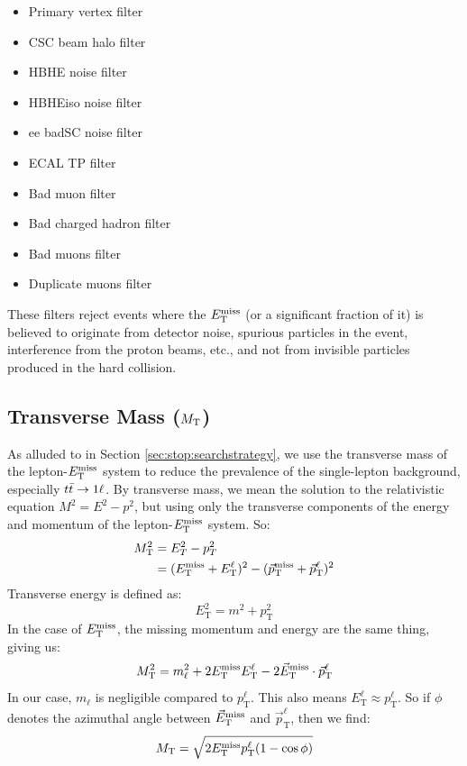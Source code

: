 \begin{itemize}
\item Primary vertex filter
\item CSC beam halo filter
\item HBHE noise filter
\item HBHEiso noise filter
\item ee badSC noise filter
\item ECAL TP filter
\item Bad muon filter
\item Bad charged hadron filter
\item Bad muons filter
\item Duplicate muons filter
\end{itemize}

These filters reject events where the $E_\text{T}^\text{miss}$ (or a significant
fraction of it) is believed to originate from detector noise, spurious
particles in the event, interference from the proton beams, etc., and
not from invisible particles produced in the hard collision.

\subsection{Transverse Mass (\texorpdfstring{$M_\text{T}$}{MT})}
\label{ssec:stop:mt}

As alluded to in Section \ref{sec:stop:searchstrategy}, we use the
transverse mass of the lepton-$E_\text{T}^\text{miss}$ system to reduce the prevalence of
the single-lepton background, especially $t\bar{t} \rightarrow 1\ell$. By transverse
mass, we mean the solution to the relativistic equation $M^2 = E^2 -
p^2$, but using only the transverse components of the energy and
momentum of the lepton-$E_\text{T}^\text{miss}$ system. So:
\begin{equation}
\begin{split}
M_\text{T}^2 & = E_T^2 - p_T^2 \\
 & = (E_\text{T}^\text{miss} + E_\text{T}^\ell)^2 - (\vec{p}_\text{T}^\text{miss} + \vec{p}_\text{T}^\ell)^2
\end{split}
\end{equation}
Transverse energy is defined as:
\begin{equation}
E_\text{T}^2 = m^2 + p_\text{T}^2
\end{equation}
In the case of $E_\text{T}^\text{miss}$, the missing momentum and energy are the same
thing, giving us:
\begin{equation}
M_\text{T}^2 = m_\ell^2 + 2E_\text{T}^\text{miss} E_\text{T}^\ell - 2 \vec{E}_\text{T}^\text{miss} \cdot \vec{p}_\text{T}^\ell
\end{equation}
In our case, $m_\ell$ is negligible compared to
$p_\text{T}^\ell$. This also means $E_\text{T}^\ell \approx p_\text{T}^\ell$.
So if $\phi$ denotes the azimuthal angle between $\vec{E}_\text{T}^\text{miss}$ and
$\vec{p}_\text{T}^\ell$, then we find:
\begin{equation}
\label{eq:stop:mt}
M_\text{T} = \sqrt{2 E_\text{T}^\text{miss} p_\text{T}^\ell (1 - \cos \phi)}
\end{equation}

